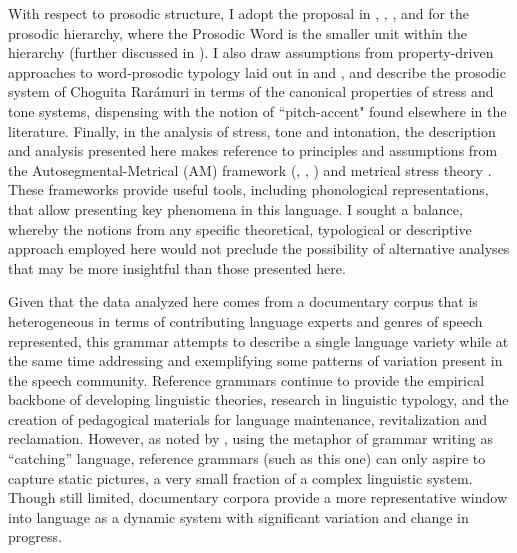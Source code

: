 With respect to prosodic structure,  I adopt the proposal in \citet{selkirk1980prosodic}, \citet{selkirk1996prosodic}, \citet{nespor1986prosodic}, and \citet{hayes1989prosodic} for the prosodic hierarchy, where the Prosodic Word is the smaller unit within the hierarchy (further discussed in ). I also draw assumptions from property-driven approaches to word-prosodic typology laid out in \citet{hyman2006word} and \citet{hyman2009not}, and describe the prosodic system of Choguita Rarámuri in terms of the canonical properties of stress and tone systems, dispensing with the notion of ``pitch-accent" found elsewhere in the literature. Finally, in the analysis of stress, tone and intonation, the description and analysis presented here makes reference to principles and assumptions from the Autosegmental-Metrical (AM) framework (\citealt{pierrehumbert1980phonology}, \citealt{beckman1986intonational}, \citealt{ladd1986intonational}) and metrical stress theory \citep{hayes1995metrical}. These frameworks provide useful tools, including phonological representations, that allow presenting key phenomena in this language. I sought a balance, whereby the notions from any specific theoretical, typological or descriptive approach employed here would not preclude the possibility of alternative analyses that may be more insightful than those presented here.

Given that the data analyzed here comes from a documentary corpus that is heterogeneous in terms of contributing language experts and genres of speech represented, this grammar attempts to describe a single language variety while at the same time addressing and exemplifying some patterns of variation present in the speech community. Reference grammars continue to provide the empirical backbone of developing linguistic theories, research in linguistic typology, and the creation of pedagogical materials for language maintenance, revitalization and reclamation. However, as noted by \citet{evans2006introduction}, using the metaphor of grammar writing as ``catching” language, reference grammars (such as this one) can only aspire to capture static pictures, a very small fraction of a complex linguistic system. Though still limited, documentary corpora provide a more representative window into language as a dynamic system with significant variation and change in progress.


